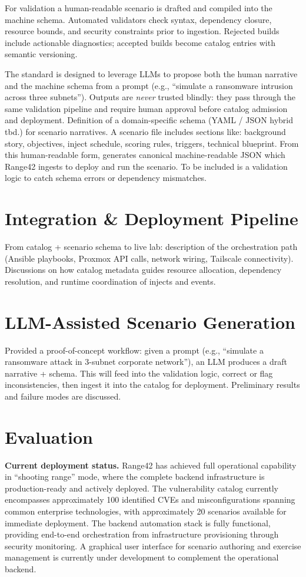 \documentclass[11pt]{article}
\begin{document}
For validation a human-readable scenario is drafted and compiled into the machine schema.
Automated validators check syntax, dependency closure, resource bounds, and security constraints prior to ingestion.
Rejected builds include actionable diagnostics; accepted builds become catalog entries with semantic versioning.

The standard is designed to leverage LLMs to propose both the human narrative and the machine schema from a prompt (e.g., ``simulate a ransomware intrusion across three subnets'').
Outputs are \emph{never} trusted blindly: they pass through the same validation pipeline and require human approval before catalog admission and deployment.
Definition of a domain-specific schema (YAML / JSON hybrid tbd.) for scenario narratives. A scenario file includes sections like: background story, objectives, inject schedule, scoring rules, triggers, technical blueprint. From this human-readable form, generates canonical machine-readable JSON which Range42 ingests to deploy and run the scenario. To be included is a validation logic to catch schema errors or dependency mismatches.

\section{Integration \& Deployment Pipeline}
From catalog + scenario schema to live lab: description of the orchestration path (Ansible playbooks, Proxmox API calls, network wiring, Tailscale connectivity). Discussions on how catalog metadata guides resource allocation, dependency resolution, and runtime coordination of injects and events.

\section{LLM-Assisted Scenario Generation}
Provided a proof-of-concept workflow: given a prompt (e.g., ``simulate a ransomware attack in 3-subnet corporate network''), an LLM produces a draft narrative + schema. This will feed into the validation logic, correct or flag inconsistencies, then ingest it into the catalog for deployment. Preliminary results and failure modes are discussed.

\section{Evaluation}

\textbf{Current deployment status.} 
Range42 has achieved full operational capability in ``shooting range'' mode, where the complete backend infrastructure is production-ready and actively deployed.
The vulnerability catalog currently encompasses approximately 100 identified CVEs and misconfigurations spanning common enterprise technologies, with approximately 20 scenarios available for immediate deployment.
The backend automation stack is fully functional, providing end-to-end orchestration from infrastructure provisioning through security monitoring.
A graphical user interface for scenario authoring and exercise management is currently under development to complement the operational backend.
\end{document}
